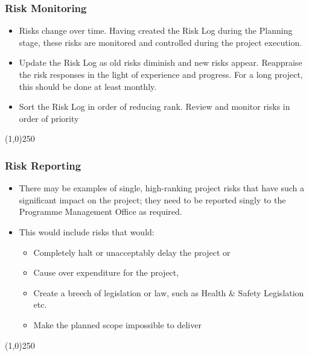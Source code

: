 \begin{frame}
\frametitle{Risk Monitoring}
\begin{itemize}
\item Risks change over time. Having created the Risk Log during the Planning stage, these risks are monitored and controlled during the project execution. 
\item Update the Risk Log as old risks diminish and new risks appear. Reappraise the risk responses in the light of experience and progress. For a long project, this should be done at least monthly.
\item Sort the Risk Log in order of reducing rank. Review and monitor risks in order of priority
\end{itemize}
\end{frame}\begin{center}\line(1,0){250}\end{center}





\begin{frame}
\frametitle{Risk Reporting}
\begin{itemize}
\item There may be examples of single, high-ranking project risks that have such a significant impact on the project; they need to be reported singly to the Programme Management Office as required. 
\item This would include risks that would:
\begin{itemize}
	\item Completely halt or unacceptably delay the project or
\item Cause over expenditure for the project,
\item Create a breech of legislation or law, such as Health \& Safety Legislation etc.
\item Make the planned scope impossible to deliver
\end{itemize}
\end{itemize}
\end{frame}\begin{center}\line(1,0){250}\end{center}




